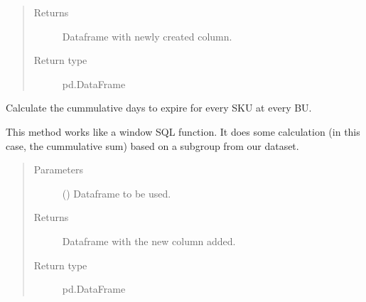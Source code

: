 \documentclass[letterpaper,10pt,english]{sphinxmanual}
\begin{document}
\begin{fulllineitems}
\begin{quote}
\begin{description}
\begin{itemize}
\end{itemize}

\item[{Returns}] \leavevmode
{} \textendash{} Dataframe with newly created column.

\item[{Return type}] \leavevmode
pd.DataFrame

\end{description}\end{quote}

\end{fulllineitems}


\begin{fulllineitems}
\label{\detokenize{source/optimization.datatools:optimization.datatools.dataprep.cumulative_days_of_inventory}}
Calculate the cummulative days to expire for every SKU at every BU.

This method works like a window SQL function. It does some calculation
(in this case, the cummulative sum) based on a subgroup from our dataset.
\begin{quote}\begin{description}
\item[{Parameters}] \leavevmode
{} () \textendash{} Dataframe to be used.

\item[{Returns}] \leavevmode
{} \textendash{} Dataframe with the new column added.

\item[{Return type}] \leavevmode
pd.DataFrame

\end{description}\end{quote}







\end{fulllineitems}
\end{document}
